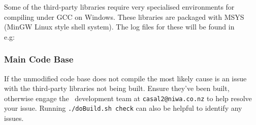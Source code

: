 Some of the third-party libraries require very specialised environments for compiling under GCC on Windows. These libraries are packaged with MSYS (MinGW Linux style shell system). The log files for these will be found in 
\\
e.g:
\\ 

\subsubsection{Main Code Base}
If the unmodified code base does not compile the most likely cause is an issue with the third-party libraries not being built. Ensure they’ve been built, otherwise engage the \CNAME\ development team at \texttt{casal2@niwa.co.nz} to help resolve your issue.
Running \texttt{./doBuild.sh check} can also be helpful to identify any issues.


